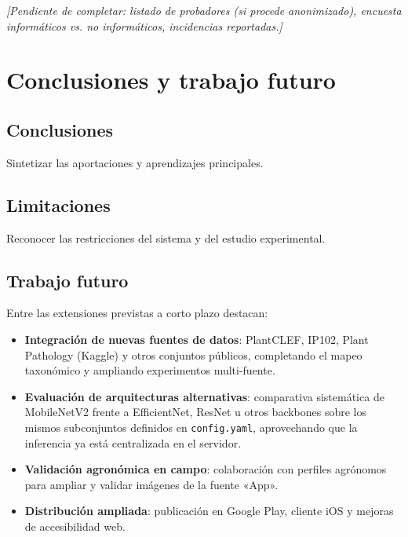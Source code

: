 \documentclass[11pt,spanish,listoffigures,listoftables]{tfgetsinf}
\begin{document}
\textit{[Pendiente de completar: listado de probadores (si procede anonimizado), encuesta informáticos vs. no informáticos, incidencias reportadas.]}

\chapter{Conclusiones y trabajo futuro}
\section{Conclusiones}
Sintetizar las aportaciones y aprendizajes principales.

\section{Limitaciones}
Reconocer las restricciones del sistema y del estudio experimental.

\section{Trabajo futuro}

Entre las extensiones previstas a corto plazo destacan:

\begin{itemize}
    \item \textbf{Integración de nuevas fuentes de datos}: PlantCLEF, IP102, Plant Pathology (Kaggle) y otros conjuntos públicos, completando el mapeo taxonómico y ampliando experimentos multi-fuente.
    \item \textbf{Evaluación de arquitecturas alternativas}: comparativa sistemática de MobileNetV2 frente a EfficientNet, ResNet u otros backbones sobre los mismos subconjuntos definidos en \texttt{config.yaml}, aprovechando que la inferencia ya está centralizada en el servidor.
    \item \textbf{Validación agronómica en campo}: colaboración con perfiles agrónomos para ampliar y validar imágenes de la fuente «App».
    \item \textbf{Distribución ampliada}: publicación en Google Play, cliente iOS y mejoras de accesibilidad web.
\end{itemize}
\end{document}
